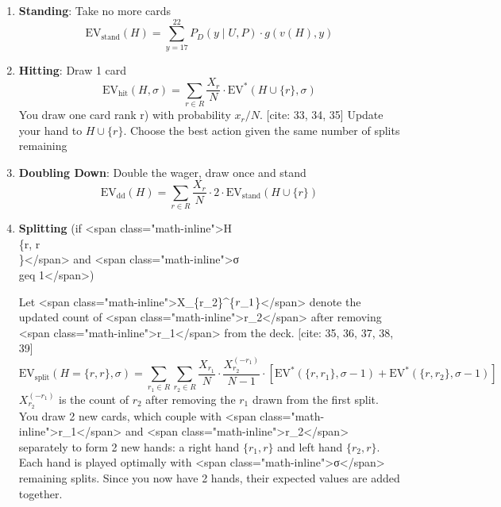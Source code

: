 \documentclass[12pt,a4paper]{cibb}
\begin{document}
\begin{enumerate}
    \item \textbf{Standing}: Take no more cards
    \begin{equation}
        \mathrm{EV}_{\text{stand}}(H) = \sum_{y=17}^{22} P_D(y \mid U, P) \cdot g(v(H), y)
        \label{eq:EV_STAND}
    \end{equation}

    \item \textbf{Hitting}: Draw 1 card
    \begin{equation}
          \mathrm{EV}_{\text{hit}}(H, σ  ) = \sum_{r \in R} \frac{X_r}{N} \cdot \mathrm{EV}^*(H \cup \{r\}, σ  )
        \label{eq:EV_HIT}
    \end{equation}
You draw one card rank r) with probability \(x_r/N\). [cite: 33, 34, 35]
Update your hand to \(H \cup \{r\}\). Choose the best action given the same number of splits remaining

    \item \textbf{Doubling Down}: Double the wager, draw once and stand
    \begin{equation}
        \mathrm{EV}_{\text{dd}}(H) = \sum_{r \in R} \frac{X_r}{N} \cdot 2 \cdot \mathrm{EV}_{\text{stand}}(H \cup \{r\})
        \label{eq:EV_DOUBLE}
    \end{equation}

    \item \textbf{Splitting} (if <span class="math-inline">H \= \\\{r, r\\\}</span> and <span class="math-inline">σ \\geq 1</span>)

    Let <span class="math-inline">X\_\{r\_2\}^\{\(\-r\_1\)\}</span> denote the updated count of <span class="math-inline">r\_2</span> after removing <span class="math-inline">r\_1</span> from the deck. [cite: 35, 36, 37, 38, 39]
    \begin{equation}
        \mathrm{EV}_{\text{split}}(H = \{r, r\}, σ  ) = \sum_{r_1 \in R} \sum_{r_2 \in R} \frac{X_{r_1}}{N} \cdot \frac{X_{r_2}^{(-r_1)}}{N - 1} \cdot \left[ \mathrm{EV}^*(\{r, r_1\}, σ   - 1) + \mathrm{EV}^*(\{r, r_2\}, σ   - 1) \right]
        \label{eq:EV_SPLIT}
    \end{equation}
\({X_{r_2}^{(-r_1)}}\) is the count of \(r_2\) after removing the \(r_1\) drawn from the first split.
You draw 2 new cards, which couple with <span class="math-inline">r\_1</span> and <span class="math-inline">r\_2</span> separately to form 2 new hands: a right hand \( \{r_1, r\}\) and left hand \( \{r_2, r\}\).
Each hand is played optimally with <span class="math-inline">σ</span> remaining splits. Since you now have 2 hands, their expected values are added together.
\end{enumerate}
\end{document}
